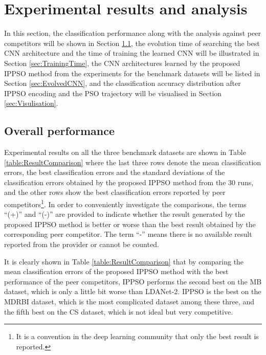 \documentclass[conference]{IEEEtran}
\begin{document}
\section{Experimental results and analysis}\label{sec:EPResults}

In this section, the classification performance along with the analysis against peer competitors will be shown in Section \ref{sec:Performance}, the evolution time of searching the best CNN architecture and the time of training the learned CNN will be illustrated in Section \ref{sec:TrainingTime}, 
the CNN architectures learned by the proposed IPPSO method from the experiments for the benchmark datasets will be listed in Section \ref{sec:EvolvedCNN}, and the classification accuracy distribution after IPPSO encoding and the PSO trajectory will be visualised in Section \ref{sec:Visulisation}. 

\subsection{Overall performance}\label{sec:Performance}

Experimental results on all the three benchmark datasets are shown in Table \ref{table:ResultComparison} where the last three rows denote the mean classification errors, the best classification errors and the standard deviations of the classification errors obtained by the proposed IPPSO method from the 30 runs, and the other rows show the best classification errors reported by peer competitors\footnote{It is a convention in the deep learning community that only the best result is reported.}. In order to conveniently investigate the comparisons, the terms “(+)” and “(-)” are provided to indicate whether the result generated by the proposed IPPSO method is better or worse than the best result obtained by the corresponding peer competitor. The term “-” means there is no available result reported from the provider or cannot be counted.


It is clearly shown in Table \ref{table:ResultComparison} that by comparing the mean classification errors of the proposed IPPSO method with the best performance of the peer competitors, IPPSO performs the second best on the MB dataset, which is only a little bit worse than LDANet-2. IPPSO is the best on the MDRBI dataset, which is the most complicated dataset among these three, and the fifth best on the CS dataset, which is not ideal but very competitive. 
\end{document}
